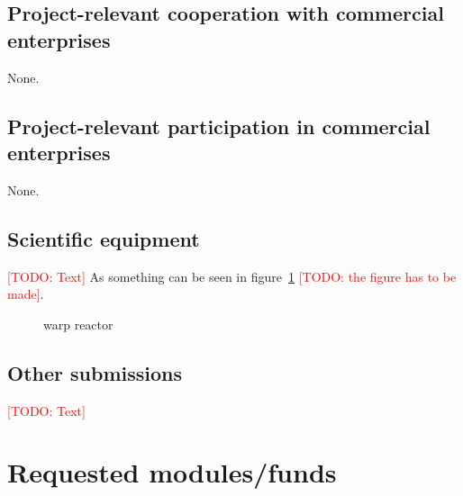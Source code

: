 \documentclass[ngerman,firsttime]{dfgproposal}
\newcommand{\todo}[1]{\xspace{\textcolor{red}{[TODO: #1]}}\xspace}
\begin{document}
	\subsection{Project-relevant cooperation with commercial enterprises}
	None.
	
	\subsection{Project-relevant participation in commercial enterprises}
	None.
	
	\subsection{Scientific equipment}
	\todo{Text}
	As something can be seen in figure~\ref{fig:some_nice_graph} \todo{the figure has to be made}.
	\begin{figure}
		\centering
		\caption{warp reactor}
		\label{fig:some_nice_graph}
	\end{figure}
	
	\subsection{Other submissions}
	\todo{Text}
	
	
	\section{Requested modules/funds}
	
\end{document}
